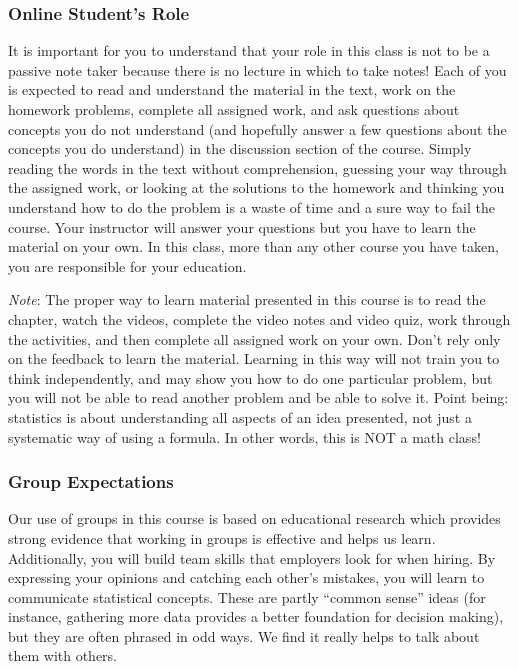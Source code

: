 \documentclass[
]{article}
\begin{document}
\subsubsection{Online Student's Role}\label{online-students-role}

It is important for you to understand that your role in this class is
not to be a passive note taker because there is no lecture in which to
take notes! Each of you is expected to read and understand the material
in the text, work on the homework problems, complete all assigned work,
and ask questions about concepts you do not understand (and hopefully
answer a few questions about the concepts you do understand) in the
discussion section of the course. Simply reading the words in the text
without comprehension, guessing your way through the assigned work, or
looking at the solutions to the homework and thinking you understand how
to do the problem is a waste of time and a sure way to fail the course.
Your instructor will answer your questions but you have to learn the
material on your own. In this class, more than any other course you have
taken, you are responsible for your education.

\emph{Note}: The proper way to learn material presented in this course
is to read the chapter, watch the videos, complete the video notes and
video quiz, work through the activities, and then complete all assigned
work on your own. Don't rely only on the feedback to learn the material.
Learning in this way will not train you to think independently, and may
show you how to do one particular problem, but you will not be able to
read another problem and be able to solve it. Point being: statistics is
about understanding all aspects of an idea presented, not just a
systematic way of using a formula. In other words, this is NOT a math
class!

\subsubsection{Group Expectations}\label{group-expectations}

Our use of groups in this course is based on educational research which
provides strong evidence that working in groups is effective and helps
us learn. Additionally, you will build team skills that employers look
for when hiring. By expressing your opinions and catching each other's
mistakes, you will learn to communicate statistical concepts. These are
partly ``common sense'' ideas (for instance, gathering more data
provides a better foundation for decision making), but they are often
phrased in odd ways. We find it really helps to talk about them with
others.
\end{document}
